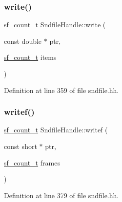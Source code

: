 \mbox{\label{class_sndfile_handle_aa659622dcc3b1c838c8395b008e80416}} 
\subsubsection{\texorpdfstring{write()}{write()}\hspace{0.1cm}{\footnotesize\ttfamily [4/4]}}
{\footnotesize\ttfamily \mbox{\hyperlink{sndfile_8h_af2b12fded74bc949f1f1f392a2af4892}{sf\+\_\+count\+\_\+t}} Sndfile\+Handle\+::write (\begin{DoxyParamCaption}\item[{const double $\ast$}]{ptr,  }\item[{\mbox{\hyperlink{sndfile_8h_af2b12fded74bc949f1f1f392a2af4892}{sf\+\_\+count\+\_\+t}}}]{items }\end{DoxyParamCaption})\hspace{0.3cm}{\ttfamily [inline]}}



Definition at line 359 of file sndfile.\+hh.

\mbox{\label{class_sndfile_handle_aaeef77f4a93210244e21f913b3c378b4}} 
\subsubsection{\texorpdfstring{writef()}{writef()}\hspace{0.1cm}{\footnotesize\ttfamily [1/4]}}
{\footnotesize\ttfamily \mbox{\hyperlink{sndfile_8h_af2b12fded74bc949f1f1f392a2af4892}{sf\+\_\+count\+\_\+t}} Sndfile\+Handle\+::writef (\begin{DoxyParamCaption}\item[{const short $\ast$}]{ptr,  }\item[{\mbox{\hyperlink{sndfile_8h_af2b12fded74bc949f1f1f392a2af4892}{sf\+\_\+count\+\_\+t}}}]{frames }\end{DoxyParamCaption})\hspace{0.3cm}{\ttfamily [inline]}}



Definition at line 379 of file sndfile.\+hh.

\mbox{\label{class_sndfile_handle_a841acc6961dcca46bbb88aee97ebaeb2}} 
